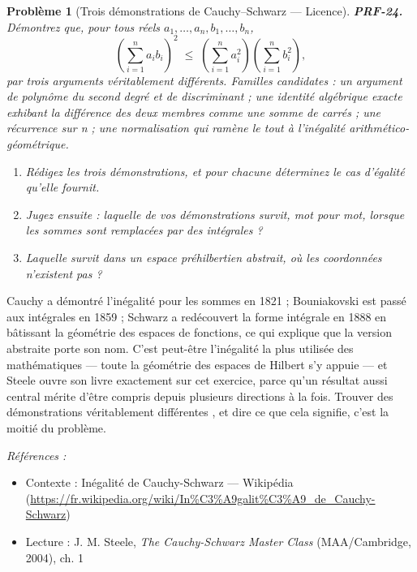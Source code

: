 \documentclass[11pt]{article}
\newtheorem{problem}{Problème}
\newenvironment{refs}{\par\small\noindent\emph{Références :}\begin{itemize}\setlength\itemsep{0pt}}{\end{itemize}\normalsize}
\begin{document}
\begin{problem}[{Trois démonstrations de Cauchy--Schwarz --- Licence}]
\textbf{PRF-24.} Démontrez que, pour tous réels
$ a_1, \dots, a_n, b_1, \dots, b_n $,
\[ \left( \sum_{i=1}^{n} a_i b_i \right)^{\!2} \;\le\; \left( \sum_{i=1}^{n} a_i^2 \right) \left( \sum_{i=1}^{n} b_i^2 \right), \]
par trois arguments véritablement différents. Familles candidates : un argument de polynôme
du second degré et de discriminant ; une identité algébrique exacte exhibant la différence
des deux membres comme une somme de carrés ; une récurrence sur n ; une normalisation qui
ramène le tout à l'inégalité arithmético-géométrique.
\begin{enumerate}
\item[(a)] Rédigez les trois démonstrations, et pour chacune déterminez le cas d'égalité qu'elle
fournit.
\item[(b)] Jugez ensuite : laquelle de vos démonstrations survit, mot pour mot, lorsque les sommes
sont remplacées par des intégrales ?
\item[(c)] Laquelle survit dans un espace préhilbertien abstrait, où les coordonnées n'existent
pas ?
\end{enumerate}

\end{problem}

\noindent Cauchy a démontré l'inégalité pour les sommes en 1821 ; Bouniakovski est
passé aux intégrales en 1859 ; Schwarz a redécouvert la forme intégrale en 1888 en bâtissant
la géométrie des espaces de fonctions, ce qui explique que la version abstraite porte son
nom. C'est peut-être l'inégalité la plus utilisée des mathématiques --- toute la géométrie des
espaces de Hilbert s'y appuie --- et Steele ouvre son livre exactement sur cet exercice, parce
qu'un résultat aussi central mérite d'être compris depuis plusieurs directions à la fois.
Trouver des démonstrations \og{} véritablement différentes \fg{}, et dire ce que cela signifie, c'est
la moitié du problème.

\begin{refs}
\item Contexte : Inégalité de Cauchy-Schwarz --- Wikipédia (\url{https://fr.wikipedia.org/wiki/In%C3%A9galit%C3%A9_de_Cauchy-Schwarz})
\item Lecture : J. M. Steele, \textit{The Cauchy-Schwarz Master Class} (MAA/Cambridge, 2004), ch. 1
\end{refs}

\bigskip
\end{document}
